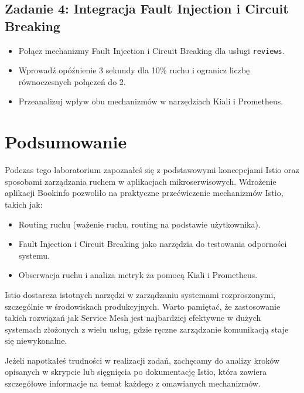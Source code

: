 \documentclass{article}
\begin{document}
\subsection{Zadanie 4: Integracja Fault Injection i Circuit Breaking}

\begin{itemize}
    \item Połącz mechanizmy Fault Injection i Circuit Breaking dla usługi \texttt{reviews}.
    \item Wprowadź opóźnienie 3 sekundy dla 10\% ruchu i ogranicz liczbę równoczesnych połączeń do 2.
    \item Przeanalizuj wpływ obu mechanizmów w narzędziach Kiali i Prometheus.
\end{itemize}
\section{Podsumowanie}

Podczas tego laboratorium zapoznałeś się z podstawowymi koncepcjami Istio oraz sposobami zarządzania ruchem w aplikacjach mikroserwisowych. Wdrożenie aplikacji Bookinfo pozwoliło na praktyczne przećwiczenie mechanizmów Istio, takich jak:

\begin{itemize}
    \item Routing ruchu (ważenie ruchu, routing na podstawie użytkownika).
    \item Fault Injection i Circuit Breaking jako narzędzia do testowania odporności systemu.
    \item Obserwacja ruchu i analiza metryk za pomocą Kiali i Prometheus.
\end{itemize}

Istio dostarcza istotnych narzędzi w zarządzaniu systemami rozproszonymi, szczególnie w środowiskach produkcyjnych. Warto pamiętać, że zastosowanie takich rozwiązań jak Service Mesh jest najbardziej efektywne w dużych systemach złożonych z wielu usług, gdzie ręczne zarządzanie komunikacją staje się niewykonalne.

Jeżeli napotkałeś trudności w realizacji zadań, zachęcamy do analizy kroków opisanych w skrypcie lub sięgnięcia po dokumentację Istio, która zawiera szczegółowe informacje na temat każdego z omawianych mechanizmów.
\end{document}
